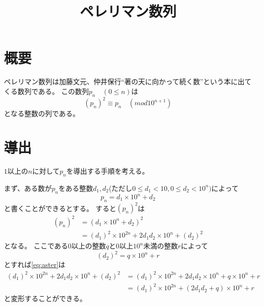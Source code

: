 \documentclass[uplatex, 11pt, a4j, dvipdfmx]{jsarticle}
\title{ペレリマン数列}
\author{}
\date{}
\begin{document}
\maketitle

\section{概要}
  ペレリマン数列は加藤文元、仲井保行``著の天に向かって続く数''という本に出てくる数列である。
  この数列$p_n \quad (0 \leq n)$は
  \begin{equation}
    (p_n)^2 \equiv p_n \quad (mod 10^{n+1}) \label{eq:s}
  \end{equation}
  となる整数の列である。

\section{導出}
  $1$以上の$n$に対して$p_n$を導出する手順を考える。

  まず、ある数が$p_n$をある整数$d_1, d_2$(ただし$0 \leq d_1 < 10, 0 \leq d_2 < 10^n)$によって
  \begin{equation}
    p_n = d_1 \times 10^n + d_2
  \end{equation}
  と書くことができるとする。
  すると$(p_n)^2$は
  \begin{equation} \begin{aligned}
    (p_n)^2 &= (d_1 \times 10^n + d_2)^2 \\
            &= (d_1)^2 \times 10^{2n} + 2 d_1 d_2 \times 10^n + (d_2)^2 \label{eq:aster}
  \end{aligned} \end{equation}
  となる。
  ここである$0$以上の整数$q$と$0$以上$10^n$未満の整数$r$によって
  \begin{equation}
    (d_2)^2 = q \times 10^n + r
  \end{equation}
  とすれば\cref{eq:aster}は
  \begin{equation} \begin{aligned}
    (d_1)^2 \times 10^{2n} + 2 d_1 d_2 \times 10^n + (d_2)^2
            &= (d_1)^2 \times 10^{2n} + 2 d_1 d_2 \times 10^n + q \times 10^n + r \\
            &= (d_1)^2 \times 10^{2n} + (2 d_1 d_2 + q) \times 10^n + r \label{eq:aster2}
  \end{aligned} \end{equation}
  と変形することができる。
\end{document}
